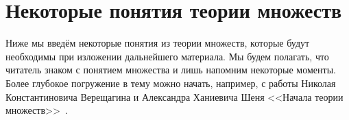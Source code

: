 \setchapterpreamble[u]{\margintoc}
\chapter{Некоторые понятия теории множеств}
\label{chpt:SetTheory}

Ниже мы введём некоторые понятия из теории множеств, которые будут необходимы при изложении дальнейшего материала.
Мы будем полагать, что читатель знаком с понятием множества и лишь напомним некоторые моменты.
Более глубокое погружение в тему можно начать, например, с работы Николая Константиновича Верещагина и Александра Ханиевича Шеня <<Начала теории множеств>>~.



